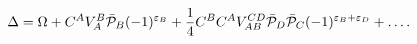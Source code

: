 \begin{equation}\label{13}
\Delta=\Omega+C^AV_A^B\bar{\cal P}_B(-1)^{\varepsilon_B}+
\frac{1}{4}C^BC^AV^{CD}_{AB}\bar{\cal P}_D\bar{\cal P}_C
(-1)^{\varepsilon_B+\varepsilon_D}+\ldots.
\end{equation}


